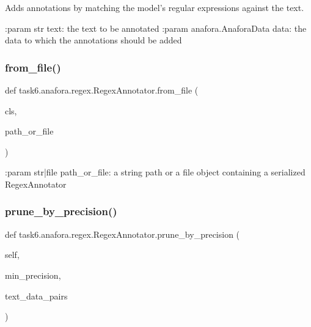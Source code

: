 \begin{DoxyVerb}Adds annotations by matching the model's regular expressions against the text.

:param str text: the text to be annotated
:param anafora.AnaforaData data: the data to which the annotations should be added
\end{DoxyVerb}
 \mbox{\label{classtask6_1_1anafora_1_1regex_1_1RegexAnnotator_ace3b9403ea6504f3971ed8d8fb6c8f06}} 
\subsubsection{\texorpdfstring{from\+\_\+file()}{from\_file()}}
{\footnotesize\ttfamily def task6.\+anafora.\+regex.\+Regex\+Annotator.\+from\+\_\+file (\begin{DoxyParamCaption}\item[{}]{cls,  }\item[{}]{path\+\_\+or\+\_\+file }\end{DoxyParamCaption})}

\begin{DoxyVerb}:param str|file path_or_file: a string path or a file object containing a serialized RegexAnnotator
\end{DoxyVerb}
 \mbox{\label{classtask6_1_1anafora_1_1regex_1_1RegexAnnotator_a0978b0b00a66a7110cb190fca5d17eaf}} 
\subsubsection{\texorpdfstring{prune\+\_\+by\+\_\+precision()}{prune\_by\_precision()}}
{\footnotesize\ttfamily def task6.\+anafora.\+regex.\+Regex\+Annotator.\+prune\+\_\+by\+\_\+precision (\begin{DoxyParamCaption}\item[{}]{self,  }\item[{}]{min\+\_\+precision,  }\item[{}]{text\+\_\+data\+\_\+pairs }\end{DoxyParamCaption})}

